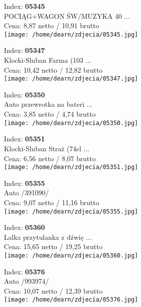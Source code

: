 {Index: \textbf{05345}\\
POCIĄG+WAGON ŚW/MUZYKA 40 ...\\
Cena: 8,87 netto / 10,91 brutto\\
  \texttt{[image: /home/dearn/zdjecia/05345.jpg]}}\newline\newline

{Index: \textbf{05347}\\
Klocki-Sluban Farma (103  ...\\
Cena: 10,42 netto / 12,82 brutto\\
  \texttt{[image: /home/dearn/zdjecia/05347.jpg]}}\newline\newline

{Index: \textbf{05350}\\
Auto przewrotka na bateri ...\\
Cena: 3,85 netto / 4,74 brutto\\
  \texttt{[image: /home/dearn/zdjecia/05350.jpg]}}\newline\newline

{Index: \textbf{05351}\\
Klocki-Sluban Straż (74el ...\\
Cena: 6,56 netto / 8,07 brutto\\
  \texttt{[image: /home/dearn/zdjecia/05351.jpg]}}\newline\newline

{Index: \textbf{05355}\\
Auto  /391090/\\
Cena: 9,07 netto / 11,16 brutto\\
  \texttt{[image: /home/dearn/zdjecia/05355.jpg]}}\newline\newline

{Index: \textbf{05360}\\
Lalka przytulanka z dźwię ...\\
Cena: 15,65 netto / 19,25 brutto\\
  \texttt{[image: /home/dearn/zdjecia/05360.jpg]}}\newline\newline

{Index: \textbf{05376}\\
Auto /993974/\\
Cena: 10,07 netto / 12,39 brutto\\
  \texttt{[image: /home/dearn/zdjecia/05376.jpg]}}\newline\newline

